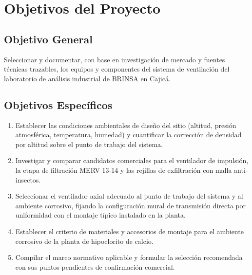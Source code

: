 \section{Objetivos del Proyecto}

\subsection{Objetivo General}

Seleccionar y documentar, con base en investigación de mercado y fuentes técnicas trazables, los equipos y componentes del sistema de ventilación del laboratorio de análisis industrial de BRINSA en Cajicá.

\subsection{Objetivos Específicos}

\begin{enumerate}
	\item Establecer las condiciones ambientales de diseño del sitio (altitud, presión atmosférica, temperatura, humedad) y cuantificar la corrección de densidad por altitud sobre el punto de trabajo del sistema.
	\item Investigar y comparar candidatos comerciales para el ventilador de impulsión, la etapa de filtración MERV 13-14 y las rejillas de exfiltración con malla anti-insectos.
	\item Seleccionar el ventilador axial adecuado al punto de trabajo del sistema y al ambiente corrosivo, fijando la configuración mural de transmisión directa por uniformidad con el montaje típico instalado en la planta.
	\item Establecer el criterio de materiales y accesorios de montaje para el ambiente corrosivo de la planta de hipoclorito de calcio.
	\item Compilar el marco normativo aplicable y formular la selección recomendada con sus puntos pendientes de confirmación comercial.
\end{enumerate}
